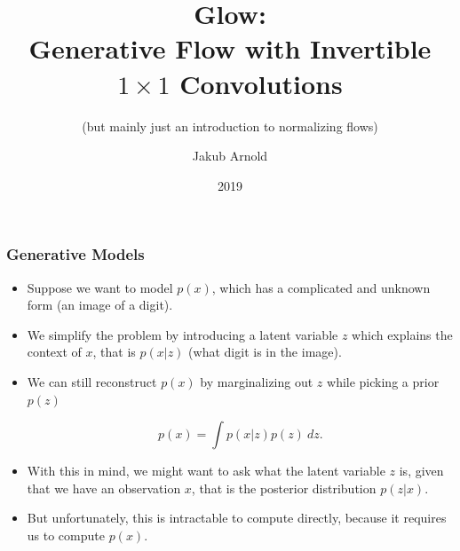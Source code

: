 \documentclass{beamer}
\title{Glow:\\ Generative Flow with Invertible $1\times1$ Convolutions}
\subtitle{(but mainly just an introduction to normalizing flows)}
\author{Jakub Arnold}
\date{2019}
\begin{document}
\frame{\titlepage}

\begin{frame}

  \frametitle{Generative Models}

  \begin{itemize}
    \item Suppose we want to model $p(x)$, which has a complicated and
      unknown form (an image of a digit).

    \item We simplify the problem by introducing a latent variable $z$ which
      explains the context of $x$, that is $p(x | z)$ (what digit is in the image).

    \item We can still reconstruct $p(x)$ by marginalizing out $z$ while
      picking a prior $p(z)$

      \[
        p(x) = \int p(x | z) p(z)\ dz.
      \]

    \item With this in mind, we might want to ask what the latent variable
      $z$ is, given that we have an observation $x$, that is the posterior
      distribution $p(z | x)$.

    \item But unfortunately, this is intractable to compute directly, because
      it requires us to compute $p(x)$.


  \end{itemize}

\end{frame}
\end{document}
